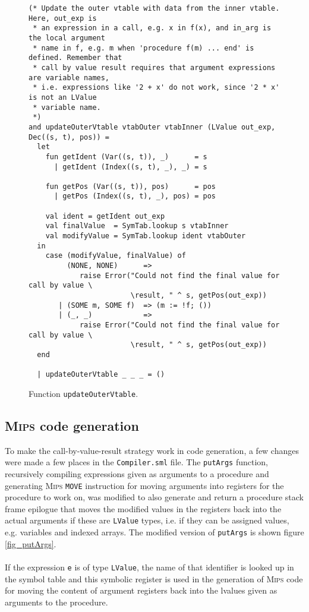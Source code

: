 \begin{figure}[H]
  \begin{lstlisting}[style=MLStyle]
(* Update the outer vtable with data from the inner vtable. Here, out_exp is
 * an expression in a call, e.g. x in f(x), and in_arg is the local argument
 * name in f, e.g. m when 'procedure f(m) ... end' is defined. Remember that
 * call by value result requires that argument expressions are variable names,
 * i.e. expressions like '2 + x' do not work, since '2 * x' is not an LValue
 * variable name.
 *)
and updateOuterVtable vtabOuter vtabInner (LValue out_exp, Dec((s, t), pos)) = 
  let
    fun getIdent (Var((s, t)), _)      = s
      | getIdent (Index((s, t), _), _) = s
    
    fun getPos (Var((s, t)), pos)      = pos
      | getPos (Index((s, t), _), pos) = pos

    val ident = getIdent out_exp
    val finalValue  = SymTab.lookup s vtabInner
    val modifyValue = SymTab.lookup ident vtabOuter
  in
    case (modifyValue, finalValue) of
         (NONE, NONE)      =>
            raise Error("Could not find the final value for call by value \
                        \result, " ^ s, getPos(out_exp))
       | (SOME m, SOME f)  => (m := !f; ())
       | (_, _)            =>
            raise Error("Could not find the final value for call by value \
                        \result, " ^ s, getPos(out_exp))
  end

  | updateOuterVtable _ _ _ = ()
  \end{lstlisting}
  \caption{Function \texttt{updateOuterVtable}.}
  \label{fig_updateOuterVtable}
\end{figure}

\subsection{\textsc{Mips} code generation}
To make the call-by-value-result strategy work in code generation, a few changes
were made a few places in the \verb|Compiler.sml| file. The \verb|putArgs|
function, recursively compiling expressions given as arguments to a procedure
and generating \textsc{Mips} \verb|MOVE| instruction for moving arguments into
registers for the procedure to work on, was modified to also generate and return
a procedure stack frame epilogue that moves the modified values in the registers
back into the actual arguments if these are \verb|LValue| types, i.e. if they
can be assigned values, e.g. variables and indexed arrays. The modified version
of \verb|putArgs| is shown figure \ref{fig_putArgs}.\\
\\
If the expression \verb|e| is of type \verb|LValue|, the name of that identifier
is looked up in the symbol table and this symbolic register is used in the
generation of \textsc{Mips} code for moving the content of argument registers back
into the lvalues given as arguments to the procedure.

